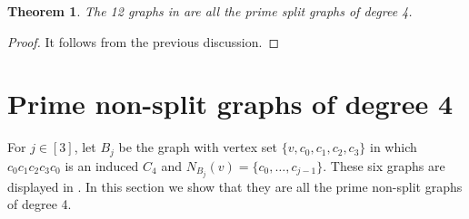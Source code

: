 \documentclass[11pt]{article}
\newtheorem{theorem}{Theorem}[section]
\begin{document}
\begin{theorem}
	\label{clasificacion.split.primos.deg=4}
	The 12 graphs in  are all the prime split graphs of degree 4.
\end{theorem}

\begin{proof}
	It follows from the previous discussion.
\end{proof}		



\section{Prime non-split graphs of degree 4}\label{sec_deg=4.no.split}


For $j\in[3]$, let $B_j$ be the graph with vertex set $\{v,c_0,c_1,c_2,c_3\}$ in which $c_0c_1c_2c_3c_0$ is an induced $C_4$ and $N_{B_j}(v)=\{c_0,\dots,c_{j-1}\}$. 
These six graphs are displayed in . In this section we show that they are all the prime non-split graphs of degree 4.
\end{document}
